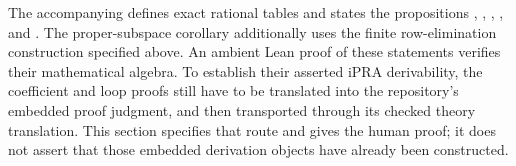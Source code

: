 The accompanying  defines exact rational
tables and states the propositions ,
, ,
, and .
The proper-subspace corollary additionally uses the finite row-elimination
construction specified above. An ambient Lean proof of these
statements verifies their mathematical algebra.  To establish their
asserted iPRA derivability, the coefficient and loop proofs still have
to be translated into the repository's embedded proof judgment, and
then transported through its checked theory translation.  This section
specifies that route and gives the human proof; it does not assert that
those embedded derivation objects have already been constructed.
